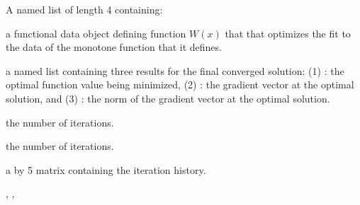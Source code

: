 \begin{Value}
A named list of length 4 containing:

\begin{ldescription}
\item[\code{Wfdobj}] a functional data object defining function $W(x)$ that that
optimizes the fit to the data of the monotone function that it defines.

\item[\code{Flist}] a named list containing three results for the final converged solution:
(1)
: the optimal function value being minimized,
(2)
: the gradient vector at the optimal solution,   and
(3)
: the norm of the gradient vector at the optimal solution.

\item[\code{iternum}] the number of iterations.

\item[\code{iternum}] the number of iterations.

\item[\code{iterhist}] a \code{} by 5 matrix containing the iteration
history.

\end{ldescription}
\end{Value}
\begin{SeeAlso}\relax
{}, 
, 
\end{SeeAlso}

